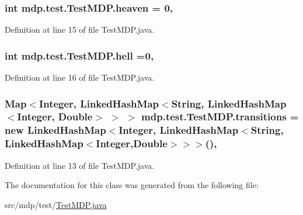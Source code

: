 \subsubsection[{heaven}]{\setlength{\rightskip}{0pt plus 5cm}int mdp.\+test.\+Test\+M\+D\+P.\+heaven = 0\hspace{0.3cm}{\ttfamily [static]}, {\ttfamily [private]}}\label{classmdp_1_1test_1_1_test_m_d_p_a9bff1df080a8b78a4cd6ed9cf58b2e0e}


Definition at line 15 of file Test\+M\+D\+P.\+java.

\hypertarget{classmdp_1_1test_1_1_test_m_d_p_a51658ab02d33480d2e59f2693f82fb5c}{}
\subsubsection[{hell}]{\setlength{\rightskip}{0pt plus 5cm}int mdp.\+test.\+Test\+M\+D\+P.\+hell =0\hspace{0.3cm}{\ttfamily [static]}, {\ttfamily [private]}}\label{classmdp_1_1test_1_1_test_m_d_p_a51658ab02d33480d2e59f2693f82fb5c}


Definition at line 16 of file Test\+M\+D\+P.\+java.

\hypertarget{classmdp_1_1test_1_1_test_m_d_p_a70b1c8db532b888003b34097b14719e4}{}
\subsubsection[{transitions}]{\setlength{\rightskip}{0pt plus 5cm}Map$<$Integer, Linked\+Hash\+Map$<$String, Linked\+Hash\+Map$<$Integer, Double$>$ $>$ $>$ mdp.\+test.\+Test\+M\+D\+P.\+transitions = new Linked\+Hash\+Map$<$Integer, Linked\+Hash\+Map$<$String, Linked\+Hash\+Map$<$Integer,Double$>$$>$$>$()\hspace{0.3cm}{\ttfamily [static]}, {\ttfamily [private]}}\label{classmdp_1_1test_1_1_test_m_d_p_a70b1c8db532b888003b34097b14719e4}


Definition at line 13 of file Test\+M\+D\+P.\+java.



The documentation for this class was generated from the following file\+:\begin{DoxyCompactItemize}
\item 
src/mdp/test/\hyperlink{_test_m_d_p_8java}{Test\+M\+D\+P.\+java}\end{DoxyCompactItemize}
